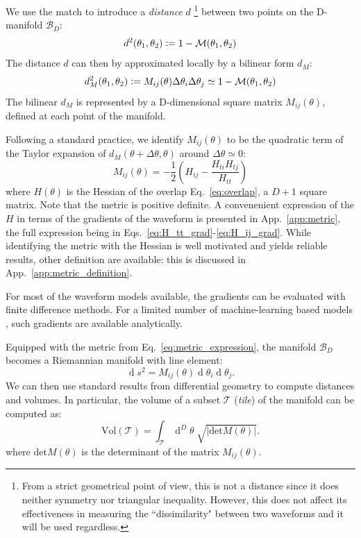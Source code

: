 \documentclass[twocolumn,showpacs,preprintnumbers,nofootinbib,prd,
superscriptaddress,10pt]{revtex4-2}
\renewcommand{\d}[1]{\ensuremath{\operatorname{d}\!{#1}}}
\newcommand{\dvol}[2]{\ensuremath{\operatorname{d}^{#2}\!{#1}}}
\begin{document}
We use the match to introduce a {\it distance} $d$ \footnote{
From a strict geometrical point of view, this is not a distance since it does neither symmetry nor triangular inequality. However, this does not affect its effectiveness in measuring the ``dissimilarity" between two waveforms and it will be used regardless.}
between two points on the D-manifold $\mathcal{B}_D$:
\begin{align}\label{eq:distance}
	d^2(\theta_1,\theta_2) \vcentcolon= 1 - \mathcal{M}(\theta_1,\theta_2)
\end{align}
The distance $d$ can then by approximated locally by a bilinear form $d_M$:
\begin{align}\label{eq:metric_definition}
	d_M^2(\theta_1,\theta_2) \vcentcolon= M_{ij}(\theta) \Delta\theta_i \Delta\theta_j \simeq 1 - \mathcal{M}(\theta_1,\theta_2)
\end{align}
The bilinear $d_M$ is represented by a D-dimensional square matrix $M_{ij}(\theta)$, defined at each point of the manifold.

Following a standard practice, we identify $M_{ij}(\theta)$ to be the quadratic term of the Taylor expansion of $d_M(\theta+\Delta\theta,\theta)$ around $\Delta\theta\simeq 0$:
\begin{equation}\label{eq:metric_expression}
	M_{ij}(\theta) = - \frac{1}{2} \left( H_{ij} - \frac{H_{ti}H_{tj}}{H_{tt}} \right)
\end{equation}
where $H(\theta)$ is the Hessian of the overlap Eq.~\eqref{eq:overlap}, a $D+1$ square matrix.
Note that the metric is positive definite. A convenenient expression of the $H$ in terms of the gradients of the waveform is presented in App.~\ref{app:metric}, the full expression being in Eqs.~\eqref{eq:H_tt_grad}-\eqref{eq:H_ij_grad}.
While identifying the metric with the Hessian is well motivated and yields reliable results, other definition are available: this is discussed in App.~\ref{app:metric_definition}.

For most of the waveform models available, the gradients can be evaluated with finite difference methods. For a limited number of machine-learning based models \cite{Khan:2020fso, PhysRevD.103.043020, ML_wf_model, Tissino:2022thn}, such gradients are available analytically.

Equipped with the metric from Eq.~\eqref{eq:metric_expression}, the manifold $\mathcal{B}_D$ becomes a Riemannian manifold with line element:
\begin{equation}\label{eq:line_element}
	\d{s^2} = M_{ij}(\theta) \d{\theta_i} \d{\theta_j}.
\end{equation}
We can then use standard results from differential geometry to compute distances and volumes. In particular, the volume of a subset $\mathcal{T}$ ({\it tile}) of the manifold can be computed as:
\begin{equation}\label{eq:volume_tile}
	\text{Vol}(\mathcal{T}) = \int_\mathcal{T} \dvol{\theta}{D} \; \sqrt{| \text{det}M(\theta)|}.
\end{equation}
where $\text{det}M(\theta)$ is the determinant of the matrix $M_{ij}(\theta)$.
\end{document}
